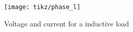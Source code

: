 \begin{figure}
	\centering
	\texttt{[image: tikz/phase\_l]}
	\caption[Voltage and current for a inductive load]{Voltage and current for a inductive load}
	\label{fig:phasel}
\end{figure}
